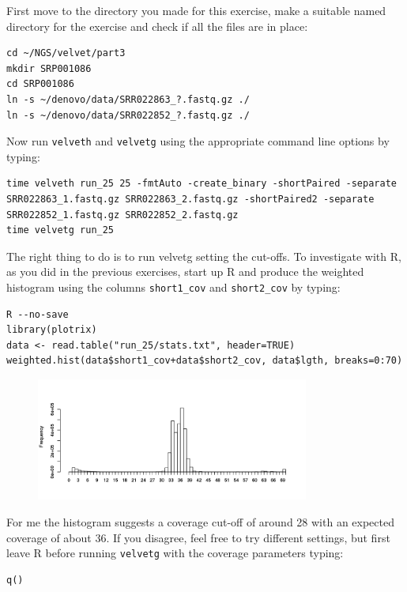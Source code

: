 \begin{steps}
First move to the directory you made for this exercise, make a suitable named
directory for the exercise and check if all the files are in place:
\begin{lstlisting}
cd ~/NGS/velvet/part3
mkdir SRP001086
cd SRP001086
ln -s ~/denovo/data/SRR022863_?.fastq.gz ./
ln -s ~/denovo/data/SRR022852_?.fastq.gz ./
\end{lstlisting}

Now run \texttt{velveth} and \texttt{velvetg} using the appropriate command line
options by typing:
\begin{lstlisting}
time velveth run_25 25 -fmtAuto -create_binary -shortPaired -separate SRR022863_1.fastq.gz SRR022863_2.fastq.gz -shortPaired2 -separate SRR022852_1.fastq.gz SRR022852_2.fastq.gz
time velvetg run_25
\end{lstlisting}

The right thing to do is to run velvetg setting the cut-offs. To investigate
with R, as you did in the previous exercises, start up R and produce the
weighted histogram using the columns \texttt{short1\_cov} and
\texttt{short2\_cov} by typing:
\begin{lstlisting}[style=R]
R --no-save
library(plotrix) 
data <- read.table("run_25/stats.txt", header=TRUE) 
weighted.hist(data$short1_cov+data$short2_cov, data$lgth, breaks=0:70)
\end{lstlisting}

\begin{figure}[H]
\centering
\includegraphics[width=0.8\textwidth]{handout/velvet/velvet_Rplot004.png}
\caption{\label{fig:velvet_Rplot004}}
\end{figure}

For me the histogram suggests a coverage cut-off of around 28
with an expected coverage of about 36. If you disagree, feel free to try
different settings, but first leave R before running \texttt{velvetg} with the coverage
parameters typing:
\begin{lstlisting}[style=R]
q()
\end{lstlisting}


\end{steps}
